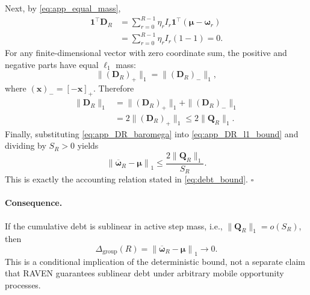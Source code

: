 \documentclass[letterpaper,journal]{IEEEtran}
\begin{document}
Next, by \eqref{eq:app_equal_mass},
\begin{align}
    \mathbf{1}^{\top}\mathbf{D}_R
    &=
    \sum_{r=0}^{R-1}
    \eta_rI_r
    \mathbf{1}^{\top}
    \left(
    \boldsymbol\mu-\boldsymbol\omega_r
    \right)
    \nonumber\\
    &=
    \sum_{r=0}^{R-1}
    \eta_rI_r(1-1)
    =0.
    \label{eq:app_DR_zero_sum}
\end{align}
For any finite-dimensional vector with zero coordinate sum, the positive and
negative parts have equal $\ell_1$ mass:
\begin{equation}
    \|(\mathbf{D}_R)_+\|_1
    =
    \|(\mathbf{D}_R)_-\|_1,
    \label{eq:app_pos_neg_equal}
\end{equation}
where
$(\mathbf{x})_-=[-\mathbf{x}]_+$.  Therefore
\begin{equation}
\begin{aligned}
    \|\mathbf{D}_R\|_1
    &=
    \|(\mathbf{D}_R)_+\|_1
    +
    \|(\mathbf{D}_R)_-\|_1\\
    &=2\|(\mathbf{D}_R)_+\|_1
    \le
    2\|\mathbf{Q}_R\|_1.
\end{aligned}
    \label{eq:app_DR_l1_bound}
\end{equation}
Finally, substituting
\eqref{eq:app_DR_baromega} into
\eqref{eq:app_DR_l1_bound} and dividing by $S_R>0$ yields
\begin{equation}
    \left\|
    \overline{\boldsymbol\omega}_R
    -
    \boldsymbol\mu
    \right\|_1
    \le
    \frac{
    2\|\mathbf{Q}_R\|_1
    }{
    S_R
    }.
    \label{eq:app_debt_bound_final}
\end{equation}
This is exactly the accounting relation stated in
\eqref{eq:debt_bound}. \hfill$\square$

\paragraph{Consequence.}
If the cumulative debt is sublinear in active step mass, i.e.,
$\|\mathbf{Q}_R\|_1=o(S_R)$, then
\begin{equation}
    \Delta_{\mathrm{group}}(R)
    =
    \left\|
    \overline{\boldsymbol\omega}_R
    -
    \boldsymbol\mu
    \right\|_1
    \longrightarrow0.
    \label{eq:app_debt_sublinear_consequence}
\end{equation}
This is a conditional implication of the deterministic bound, not a separate
claim that RAVEN guarantees sublinear debt under arbitrary mobile opportunity
processes.
\end{document}
